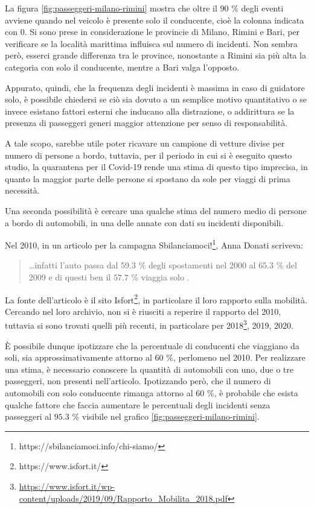 \documentclass[a4paper,12pt]{report}
\begin{document}
La figura \ref{fig:passeggeri-milano-rimini} mostra che oltre il $90$ \% degli eventi
avviene quando nel veicolo è presente solo il conducente, 
cioè la colonna indicata con 0. 
Si sono prese in considerazione le provincie di Milano, Rimini e Bari, 
per verificare se la località marittima influisca sul numero di incidenti. 
Non sembra però, esserci grande differenza tra le province, nonostante a Rimini sia 
più alta la categoria con solo il conducente, mentre a Bari valga l'opposto. 

Appurato, quindi, che la frequenza degli incidenti è massima in caso di guidatore solo, 
è possibile chiedersi se ciò sia dovuto a un semplice motivo quantitativo o 
se invece esistano fattori esterni che inducano alla distrazione, o 
addirittura se la presenza di passeggeri generi maggior 
attenzione per senso di responsabilità.

A tale scopo, sarebbe utile poter ricavare un campione di vetture divise per 
numero di persone a bordo, tuttavia, per il periodo in cui si è eseguito questo 
studio, la quarantena per il Covid-19 rende una stima di questo tipo 
imprecisa, in quanto la maggior parte delle persone si spostano da sole 
per viaggi di prima necessità. 

Una seconda possibilità è cercare una qualche stima del numero medio di 
persone a bordo di automobili, in una delle annate con dati su incidenti disponibili. 

Nel 2010, in un articolo per la campagna 
Sbilanciamoci!\footnote{https://sbilanciamoci.info/chi-siamo/}, 
Anna Donati scriveva: 

\begin{quotation}
    \dots infatti l’auto passa dal $59.3$ \% degli spostamenti nel 2000 al $65.3$ \% del 
    2009 e di questi ben il $57.7$ \% viaggia solo \cite{SBILANCIAMOCI:1}. 
\end{quotation}

La fonte dell'articolo è il sito Isfort\footnote{https://www.isfort.it/}, 
in particolare il loro rapporto sulla mobilità. 
Cercando nel loro archivio, non si è riusciti a reperire il rapporto del 2010, 
tuttavia si sono trovati quelli più recenti, in particolare per 
2018\footnote{\url{https://www.isfort.it/wp-content/uploads/2019/09/Rapporto_Mobilita_2018.pdf}}, 
2019, 2020. 

\`E possibile dunque ipotizzare che la percentuale di conducenti che viaggiano 
da soli, sia approssimativamente attorno al $60$ \%, perlomeno nel 2010. 
Per realizzare una stima, è necessario conoscere la quantità di automobili con uno, 
due o tre passeggeri, non presenti nell'articolo. 
Ipotizzando però, che il numero di automobili con solo conducente rimanga attorno al 
$60$ \%, è probabile che esista qualche fattore che faccia aumentare le percentuali 
degli incidenti senza passeggeri al 
$95.3$ \% visibile nel grafico \ref{fig:passeggeri-milano-rimini}. 
\end{document}
